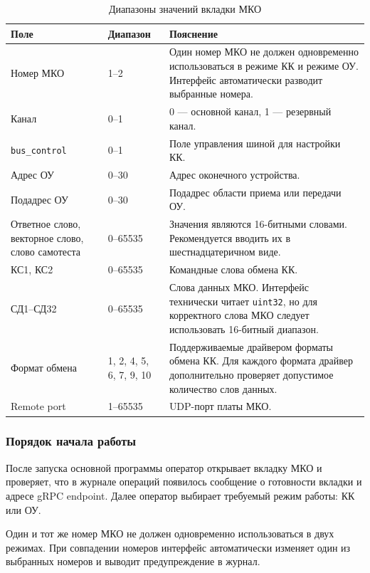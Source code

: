 \begin{table}[H]
	\caption{Диапазоны значений вкладки МКО}
	\begin{tabularx}{\textwidth}{|p{}|p{}|X|}
		\hline
		\textbf{Поле} & \textbf{Диапазон} & \textbf{Пояснение} \\
		\hline
		Номер МКО & 1--2 & Один номер МКО не должен одновременно использоваться в режиме КК и режиме ОУ. Интерфейс автоматически разводит выбранные номера. \\
		\hline
		Канал & 0--1 & 0 --- основной канал, 1 --- резервный канал. \\
		\hline
		\texttt{bus\_control} & 0--1 & Поле управления шиной для настройки КК. \\
		\hline
		Адрес ОУ & 0--30 & Адрес оконечного устройства. \\
		\hline
		Подадрес ОУ & 0--30 & Подадрес области приема или передачи ОУ. \\
		\hline
		Ответное слово, векторное слово, слово самотеста & 0--65535 & Значения являются 16-битными словами. Рекомендуется вводить их в шестнадцатеричном виде. \\
		\hline
		КС1, КС2 & 0--65535 & Командные слова обмена КК. \\
		\hline
		СД1--СД32 & 0--65535 & Слова данных МКО. Интерфейс технически читает \texttt{uint32}, но для корректного слова МКО следует использовать 16-битный диапазон. \\
		\hline
		Формат обмена & 1, 2, 4, 5, 6, 7, 9, 10 & Поддерживаемые драйвером форматы обмена КК. Для каждого формата драйвер дополнительно проверяет допустимое количество слов данных. \\
		\hline
		Remote port & 1--65535 & UDP-порт платы МКО. \\
		\hline
	\end{tabularx}
\end{table}

\subsubsection{Порядок начала работы}

После запуска основной программы оператор открывает вкладку МКО и проверяет, что в журнале операций появилось сообщение о готовности вкладки и адресе gRPC endpoint. Далее оператор выбирает требуемый режим работы: КК или ОУ.

Один и тот же номер МКО не должен одновременно использоваться в двух режимах. При совпадении номеров интерфейс автоматически изменяет один из выбранных номеров и выводит предупреждение в журнал.

